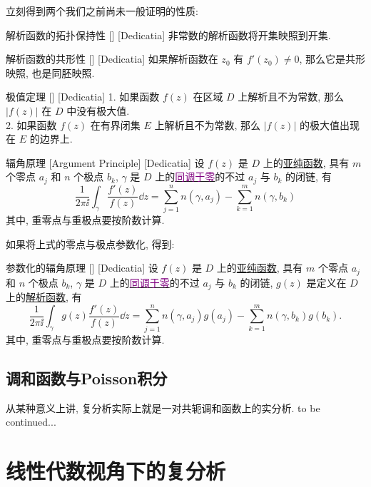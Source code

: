 \documentclass[UTF8]{ctexart}
\newcommand{\hyperrefc}[2]{\hyperref[#1]{\textcolor{purple}{#2}}}
\newcommand{\continued}{{\Large to be continued...}}
\newcommand{\AnalyticalFunction}{\hyperref[dfn:AnalyticalFunction]{解析函数}}
\newcommand{\MeromorphicFunction}{\hyperref[dfn:MeromorphicFunction]{亚纯函数}}
\begin{document}
立刻得到两个我们之前尚未一般证明的性质: 
\begin{crl}
    [UUID]
    {解析函数的拓扑保持性}
    []
    [Dedicatia]
    非常数的解析函数将开集映照到开集. 
\end{crl}
\begin{crl}
    [UUID]
    {解析函数的共形性}
    []
    [Dedicatia]
    如果解析函数在 \( z_0 \) 有 \( f'(z_0)\neq 0 \), 那么它是共形映照, 也是同胚映照. 
\end{crl}
\begin{thm}
    [UUID]
    {极值定理}
    []
    [Dedicatia]
    1. 如果函数 \( f(z) \) 在区域 \( D \) 上解析且不为常数, 那么 \( |f(z)| \) 在 \( D \) 中没有极大值. \\
    2. 如果函数 \( f(z) \) 在有界闭集 \( E \) 上解析且不为常数, 那么 \( |f(z)| \) 的极大值出现在 \( E \) 的边界上. 
\end{thm}
\begin{crl}
    [UUID]
    {辐角原理}
    [Argument Principle]
    [Dedicatia]
    设 \( f(z) \) 是 \( D \) 上的\MeromorphicFunction, 具有 \( m \) 个零点 \( a_j \) 和 \( n \) 个极点 \( b_k \),  \( \gamma \) 是 \( D \) 上的\hyperrefc{dfn:NullHomologous}{同调于零}的不过 \( a_j \) 与 \( b_k \) 的闭链, 有
    \[\frac{1}{2\pi\ii}\int_\gamma\frac{f'(z)}{f(z)}\dd{z}=\sum_{j = 1}^{n} n(\gamma,a_j)-\sum_{k = 1}^{m} n(\gamma,b_k)  \]
    其中, 重零点与重极点要按阶数计算. 
\end{crl}
如果将上式的零点与极点参数化, 得到: 
\begin{crl}
    [UUID]
    {参数化的辐角原理}
    []
    [Dedicatia]
    设 \( f(z) \) 是 \( D \) 上的\MeromorphicFunction, 具有 \( m \) 个零点 \( a_j \) 和 \( n \) 个极点 \( b_k \),  \( \gamma \) 是 \( D \) 上的\hyperrefc{dfn:NullHomologous}{同调于零}的不过 \( a_j \) 与 \( b_k \) 的闭链,  \( g(z) \) 是定义在 \( D \) 上的\AnalyticalFunction, 有
    \[\frac{1}{2\pi\ii}\int_\gamma g(z)\frac{f'(z)}{f(z)}\dd{z}=\sum_{j = 1}^{n} n(\gamma,a_j)g(a_j)-\sum_{k = 1}^{m} n(\gamma,b_k)g(b_k).  \]
    其中, 重零点与重极点要按阶数计算. 
\end{crl}
\subsection{调和函数与Poisson积分}
从某种意义上讲, 复分析实际上就是一对共轭调和函数上的实分析. 
\continued

\section{线性代数视角下的复分析}
\end{document}
